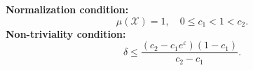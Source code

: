 \documentclass[accepted]{article}
\theoremstyle{plain} %
\theoremstyle{definition}
\theoremstyle{remark}
\newcommand{\eps}{\varepsilon}
\newcommand{\R}{\mathbb{R}}
\begin{document}
\textbf{Normalization condition:}
\begin{equation}\label{eqn: normalization condition}
    \mu(\mathcal{X}) = 1, \quad 0 \le c_1 < 1 < c_2.
\end{equation}
\textbf{Non-triviality condition:}
\begin{equation}\label{eqn: non-trivial condition condition approximate}
    \delta \leq \frac{(c_2-c_1e^\eps)(1-c_1)}{c_2-c_1}.
\end{equation}
\medskip
\end{document}
